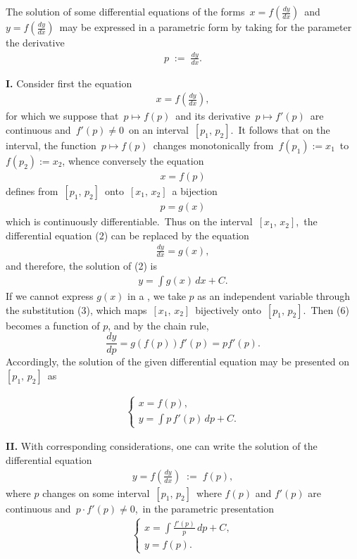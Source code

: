 \documentclass[12pt]{article}
\theoremstyle{definition}
\begin{document}

The solution of some differential equations of the forms \,$x = f(\frac{dy}{dx})$\, and\, $y = f(\frac{dy}{dx})$\, may be  expressed in a parametric form by taking for the parameter the derivative
\begin{align}
p \;:=\; \frac{dy}{dx}.
\end{align}

\textbf{I.}\; Consider first the equation
\begin{align}
x = f(\frac{dy}{dx}),
\end{align}
for which we suppose that\, $p \mapsto f(p)$\, and its derivative\, $p \mapsto f'(p)$\, are continuous and\, 
$f'(p) \neq 0$\, on an interval \,$[p_1,\,p_2]$.\, It follows that on the interval, the function \,$p \mapsto f(p)$\, changes monotonically from\, $f(p_1) := x_1$\, to\, $f(p_2) := x_2$, whence conversely the equation
\begin{align}
x = f(p)
\end{align}
defines from\, $[p_1,\,p_2]$\, onto\, $[x_1,\,x_2]$\, a bijection
\begin{align}
p = g(x)
\end{align}
which is continuously differentiable.\, Thus on the interval\, $[x_1,\,x_2]$,\, the differential equation (2) can be replaced by the equation
\begin{align}
\frac{dy}{dx} = g(x),
\end{align}
and therefore, the solution of (2) is
\begin{align}
y = \int g(x)\,dx+C.
\end{align}
If we cannot express $g(x)$ in a , we take $p$ as an independent variable through the substitution (3), which maps \,$[x_1,\,x_2]$\, bijectively onto\, $[p_1,\,p_2]$.\, Then (6) becomes a function of $p$, and by the chain rule,
$$\frac{dy}{dp} = g(f(p))f'(p) = pf'(p).$$
Accordingly, the solution of the given differential equation may be presented on\, $[p_1,\,p_2]$\, as

\begin{align}
\begin{cases}
\displaystyle x = f(p),\\
\displaystyle y = \int\!p\,f'(p)\,dp+C.
\end{cases}
\end{align}


\textbf{II.}\; With corresponding considerations, one can write the solution of the differential equation
\begin{align}
y = f(\frac{dy}{dx}) \;:=\; f(p),
\end{align}
where $p$ changes on some interval\, $[p_1,\,p_2]$\, where $f(p)$ and $f'(p)$ are continuous and\, 
$p\cdot f'(p) \neq 0$,\, in the parametric presentation
\begin{align}
\begin{cases}
\displaystyle x = \int\!\frac{f'(p)}{p}\,dp+C,\\
\displaystyle y = f(p).
\end{cases}
\end{align}
\end{document}
